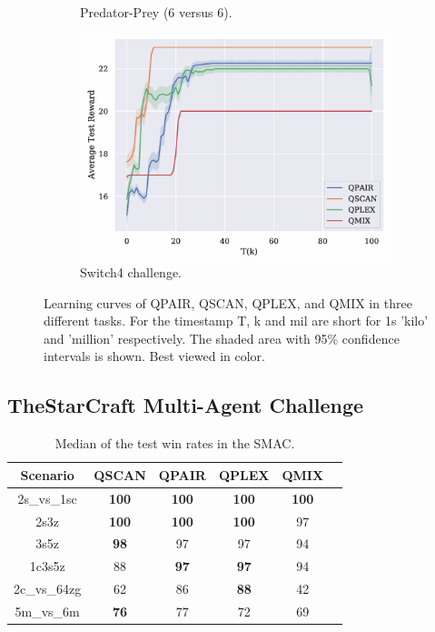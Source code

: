 \begin{figure}[htbp]
\begin{subfigure}[b]{0.3\textwidth}
            \caption{Predator-Prey (6 versus 6).}
            \label{fig:sub_learning_b}
        \end{subfigure}
        \hfill
        \begin{subfigure}[b]{0.3\textwidth}
            \centering
            \includegraphics[width=\textwidth]{images/ima1.png}
            \caption{Switch4 challenge.}
            \label{fig:sub_learning_c}
        \end{subfigure}
        \caption{Learning curves of QPAIR, QSCAN, QPLEX, and QMIX in three different tasks. For the timestamp T, k and mil are short for 1s 'kilo' and 'million' respectively. The shaded area with 95\% confidence intervals is shown. Best viewed in color.}
        \label{fig:learning_curves}
    \end{figure}



    \subsection{\large{TheStarCraft Multi-Agent Challenge}}

    \begin{table}
        \caption{ Median of the test win rates in the SMAC.}
        \label{tab:tab2}
        \begin{tabular}{cccccc}
            \hline
            Scenario & QSCAN & QPAIR & QPLEX & QMIX \\
            \hline
            2s\_vs\_1sc & \textbf{100} & \textbf{100} & \textbf{100} & \textbf{100} \\
            2s3z & \textbf{100} & \textbf{100} & \textbf{100} & 97 \\
            3s5z & \textbf{98} & 97 & 97 & 94 \\
            1c3s5z & 88 & \textbf{97} & \textbf{97} & 94 \\
            2c\_vs\_64zg & 62 & 86 & \textbf{88} & 42 \\
            5m\_vs\_6m & \textbf{76} & 77 & 72 & 69 \\
            \hline
        \end{tabular}
    \end{table}

